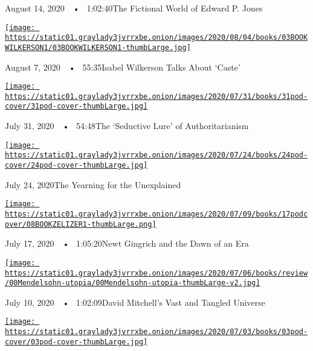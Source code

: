 August 14, 2020~~•~ 1:02:40The Fictional World of Edward P. Jones

\href{https://www.nytimes3xbfgragh.onion/2020/08/07/books/review/podcast-isabel-wilkerson-caste-david-hill-vapors.html?action=click\&module=audio-series-bar\&region=header\&pgtype=Article}{\texttt{[image: https://static01.graylady3jvrrxbe.onion/images/2020/08/04/books/03BOOKWILKERSON1/03BOOKWILKERSON1-thumbLarge.jpg]}}

August 7, 2020~~•~ 55:35Isabel Wilkerson Talks About `Caste'

\href{https://www.nytimes3xbfgragh.onion/2020/07/31/books/review/podcast-twilight-democracy-anne-applebaum-eat-buddha-barbara-demick.html?action=click\&module=audio-series-bar\&region=header\&pgtype=Article}{\texttt{[image: https://static01.graylady3jvrrxbe.onion/images/2020/07/31/books/31pod-cover/31pod-cover-thumbLarge.jpg]}}

July 31, 2020~~•~ 54:48The `Seductive Lure' of Authoritarianism

\href{https://www.nytimes3xbfgragh.onion/2020/07/24/books/review/podcast-colin-dickey-unexplained-miles-harvey-king-of-confidence.html?action=click\&module=audio-series-bar\&region=header\&pgtype=Article}{\texttt{[image: https://static01.graylady3jvrrxbe.onion/images/2020/07/24/books/24pod-cover/24pod-cover-thumbLarge.jpg]}}

July 24, 2020The Yearning for the Unexplained

\href{https://www.nytimes3xbfgragh.onion/2020/07/17/books/review/podcast-julian-zelizer-burning-down-house-newt-gingrich-notes-silencing-lacy-crawford.html?action=click\&module=audio-series-bar\&region=header\&pgtype=Article}{\texttt{[image: https://static01.graylady3jvrrxbe.onion/images/2020/07/09/books/17podcover/08BOOKZELIZER1-thumbLarge.png]}}

July 17, 2020~~•~ 1:05:20Newt Gingrich and the Dawn of an Era

\href{https://www.nytimes3xbfgragh.onion/2020/07/10/books/review/david-mitchell-utopia-avenue-daniel-mendelsohn-biggest-bluff-poker-maria-konnikova.html?action=click\&module=audio-series-bar\&region=header\&pgtype=Article}{\texttt{[image: https://static01.graylady3jvrrxbe.onion/images/2020/07/06/books/review/00Mendelsohn-utopia/00Mendelsohn-utopia-thumbLarge-v2.jpg]}}

July 10, 2020~~•~ 1:02:09David Mitchell's Vast and Tangled Universe

\href{https://www.nytimes3xbfgragh.onion/2020/07/03/books/review/podcast-jules-feiffer-smart-george-steve-inskeep-imperfect-union.html?action=click\&module=audio-series-bar\&region=header\&pgtype=Article}{\texttt{[image: https://static01.graylady3jvrrxbe.onion/images/2020/07/03/books/03pod-cover/03pod-cover-thumbLarge.jpg]}}

